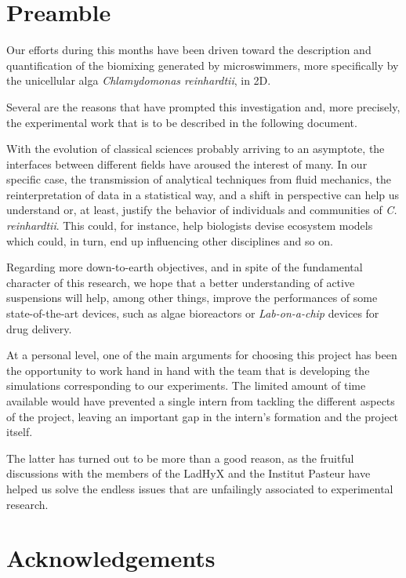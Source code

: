 \chapter*{Preamble}
\label{preamble}
\thispagestyle{empty}
Our efforts during this months have been driven toward the description and quantification of the biomixing generated by microswimmers, more specifically by the unicellular alga \textit{Chlamydomonas reinhardtii}, in 2D.

Several are the reasons that have prompted this investigation and, more precisely, the experimental work that is to be described in the following document.

With the evolution of classical sciences probably arriving to an asymptote, the interfaces between different fields have aroused the interest of many. In our specific case, the transmission of analytical techniques from fluid mechanics, the reinterpretation of data in a statistical way, and a shift in perspective can help us understand or, at least, justify the behavior of individuals and communities of \textit{C. reinhardtii}. This could, for instance, help biologists devise ecosystem models which could, in turn, end up influencing other disciplines and so on.

Regarding more down-to-earth objectives, and in spite of the fundamental character of this research, we hope that a better understanding of active suspensions will help, among other things, improve the performances of some state-of-the-art devices, such as algae bioreactors or \textit{Lab-on-a-chip} devices for drug delivery.

At a personal level, one of the main arguments for choosing this project has been the opportunity to work hand in hand with the team that is developing the simulations corresponding to our experiments. The limited amount of time available would have prevented a single intern from tackling the different aspects of the project, leaving an important gap in the intern's formation and the project itself.

The latter has turned out to be more than a good reason, as the fruitful discussions with the members of the LadHyX and the Institut Pasteur have helped us solve the endless issues that are unfailingly associated to experimental research.

\cleardoublepage %

\chapter*{Acknowledgements}

